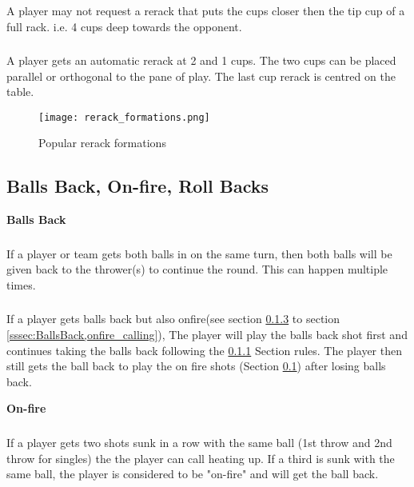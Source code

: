 		\subsubsection{}\label{sssec:Rerack,4cupdeep}
			A player may not request a rerack that puts the cups closer then the tip cup of a full rack.
            i.e. 4 cups deep towards the opponent.
		\subsubsection{}\label{sssec:Rerack,autoreracks}
			A player gets an automatic rerack at 2 and 1 cups.
            The two cups can be placed parallel or orthogonal to the pane of play.
            The last cup rerack is centred on the table.

    \begin{figure}
        \centering
        \texttt{[image: rerack\_formations.png]}
        \caption{Popular rerack formations}
        \label{fig:rerack_forms}
    \end{figure}

	\subsection{Balls Back, On-fire, Roll Backs}\label{ssec:BallsBack}

    \noindent\textbf{Balls Back}
		\subsubsection{}\label{sssec:BallsBack,bothin}
			If a player or team gets both balls in on the same turn, then both balls will be given back to the thrower(s) to continue the round.
            This can happen multiple times.
		\subsubsection{}\label{sssec:BallsBack,onfire_combine}
            If a player gets balls back but also onfire(see section \ref{sssec:BallsBack,onfire} to section \ref{sssec:BallsBack,onfire_calling}), The player will play the balls back shot first and continues taking the balls back following the \ref{sssec:BallsBack,bothin} Section rules.
            The player then still gets the ball back to play the on fire shots (Section \ref{ssec:BallsBack}) after losing balls back.

    \noindent\textbf{On-fire}
		\subsubsection{}\label{sssec:BallsBack,onfire}
			If a player gets two shots sunk in a row with the same ball (1st throw and 2nd throw for singles)  the the player can call heating up.
            If a third is sunk with the same ball, the player is considered to be "on-fire" and will get the ball back. 
